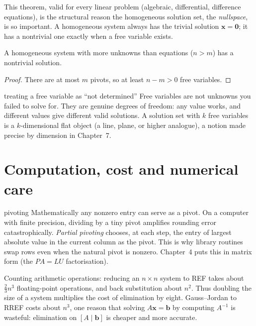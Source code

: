 This theorem, valid for every linear problem (algebraic, differential, difference equations), is the structural reason the homogeneous solution set, the \emph{nullspace}, is so important. A homogeneous system always has the trivial solution $\mathbf{x}=\mathbf{0}$; it has a nontrivial one exactly when a free variable exists.

\begin{corollary}\label{cor:underdet}
A homogeneous system with more unknowns than equations ($n>m$) has a nontrivial solution.
\end{corollary}

\begin{proof}
There are at most $m$ pivots, so at least $n-m>0$ free variables.
\end{proof}

\begin{pitfall}{treating a free variable as ``not determined''}
Free variables are not unknowns you failed to solve for. They are genuine degrees of freedom: any value works, and different values give different valid solutions. A solution set with $k$ free variables is a $k$-dimensional flat object (a line, plane, or higher analogue), a notion made precise by dimension in Chapter~7.
\end{pitfall}

\section{Computation, cost and numerical care}

\begin{nuance}{pivoting}
Mathematically any nonzero entry can serve as a pivot. On a computer with finite precision, dividing by a tiny pivot amplifies rounding error catastrophically. \emph{Partial pivoting} chooses, at each step, the entry of largest absolute value in the current column as the pivot. This is why library routines swap rows even when the natural pivot is nonzero. Chapter~4 puts this in matrix form (the $PA=LU$ factorisation).
\end{nuance}

Counting arithmetic operations: reducing an $n\times n$ system to REF takes about $\tfrac23n^3$ floating-point operations, and back substitution about $n^2$. Thus doubling the size of a system multiplies the cost of elimination by eight. Gauss--Jordan to RREF costs about $n^3$, one reason that solving $A\mathbf{x}=\mathbf{b}$ by computing $A^{-1}$ is wasteful: elimination on $[A\mid\mathbf{b}]$ is cheaper and more accurate.

